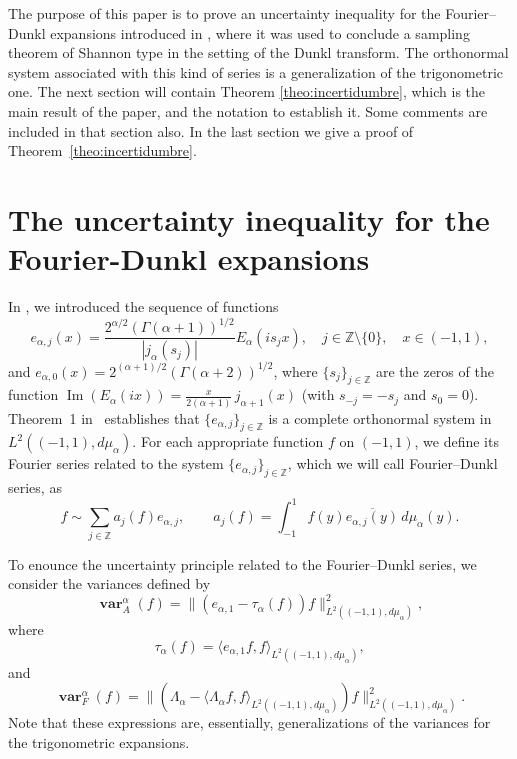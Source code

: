 \documentclass[a4paper]{amsart}
\theoremstyle{plain}
\theoremstyle{definition}
\renewcommand{\Im}{\operatorname{Im}}
\newcommand{\varneg}{\operatorname{\mathbf{var}}}
\begin{document}
The purpose of this paper is to prove an uncertainty inequality
for the Fourier--Dunkl expansions introduced in \cite{Ciau-Var1},
where it was used to conclude a sampling theorem of Shannon type
in the setting of the Dunkl transform. The orthonormal system
associated with this kind of series is a generalization of the
trigonometric one. The next section will contain Theorem
\ref{theo:incertidumbre}, which is the main result of the paper,
and the notation to establish it. Some comments are included in
that section also. In the last section we give a proof of
Theorem~\ref{theo:incertidumbre}.

\section{The uncertainty inequality for the Fourier-Dunkl expansions}

In \cite{Ciau-Var1}, we introduced the sequence of functions
\begin{equation}
\label{eq:eaj}
  e_{\alpha,j}(x) = \frac{2^{\alpha/2}(\Gamma(\alpha+1))^{1/2}}
    {|j_{\alpha}(s_j)|} E_{\alpha}(is_j x),
  \quad j\in \mathbb{Z} \setminus\{0\}, \quad x \in (-1,1),
\end{equation}
and $e_{\alpha,0}(x) = 2^{(\alpha+1)/2}(\Gamma(\alpha+2))^{1/2}$,
where $\{s_j\}_{j\in \mathbb{Z}}$ are the zeros of the function
$\Im(E_{\alpha}(ix)) = \frac{x}{2(\alpha+1)}\, j_{\alpha+1}(x)$
(with $s_{-j} = -s_j$ and $s_0 = 0$). Theorem~1 in~\cite{Ciau-Var1} establishes that $\{e_{\alpha,j}\}_{j\in\mathbb{Z}}$ is a complete orthonormal system in $L^2((-1,1),d\mu_\alpha)$. For each appropriate function $f$ on $(-1,1)$, we define its Fourier series related to the system $\{e_{\alpha,j}\}_{j\in\mathbb{Z}}$, which we will call Fourier--Dunkl series, as
\[
f\sim \sum_{j\in \mathbb{Z}} a_j(f)e_{\alpha,j}, 
\qquad a_j(f)=\int_{-1}^1 f(y)\overline{e_{\alpha,j}(y)}\, d\mu_\alpha(y).
\]

To enounce the uncertainty principle related to the Fourier--Dunkl series, we consider the variances defined by
\[
\varneg_A^\alpha(f)
= \|(e_{\alpha,1}-\tau_\alpha(f))f\|_{L^2((-1,1),d\mu_\alpha)}^2,
\]
where
\[
\tau_\alpha(f) = \langle e_{\alpha,1}f,f \rangle_{L^2((-1,1),d\mu_\alpha)},
\]
and
\[
\varneg_F^\alpha(f) 
= \|(\Lambda_\alpha-\langle \Lambda_\alpha f,
f\rangle_{L^2((-1,1),d\mu_\alpha)})f\|_{L^2((-1,1),d\mu_\alpha)}^2.
\]
Note that these expressions are, essentially, generalizations of the variances for the trigonometric expansions.
\end{document}
